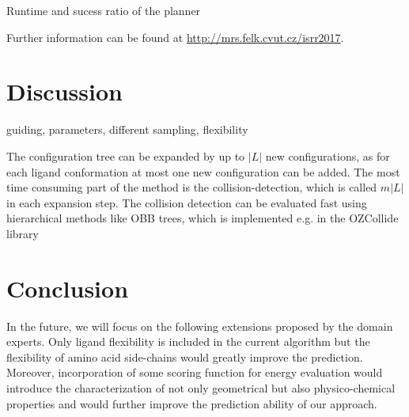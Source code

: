 \documentclass{svmult}
\def\L{L}
\begin{document}
\begin{table}
\centering
\caption{\label{tab::rrt}
    Runtime and sucess ratio of the planner
}

\hskip 10pt

\end{table}



Further information can be found at {\url{http://mrs.felk.cvut.cz/isrr2017}}.

\section{Discussion}



guiding, parameters, different sampling, flexibility

The configuration tree can be expanded by up to $|\L|$ new configurations, as for each ligand conformation at most
one new configuration can be added.
The most time consuming part of the method is the collision-detection, which is called $m|\L|$ in each expansion step.
The collision detection can be evaluated fast using hierarchical methods like OBB trees, which is implemented e.g. in the OZCollide library~\cite{ozcollide}


\section{Conclusion }
In the future, we will focus on the following extensions proposed by the domain experts.
Only ligand flexibility is included in the current algorithm but the flexibility of amino acid side-chains would greatly improve the prediction. 
Moreover, incorporation of some scoring function for energy evaluation would introduce the characterization of not only geometrical but also physico-chemical properties and would further improve the prediction ability of our approach.




\end{document}
